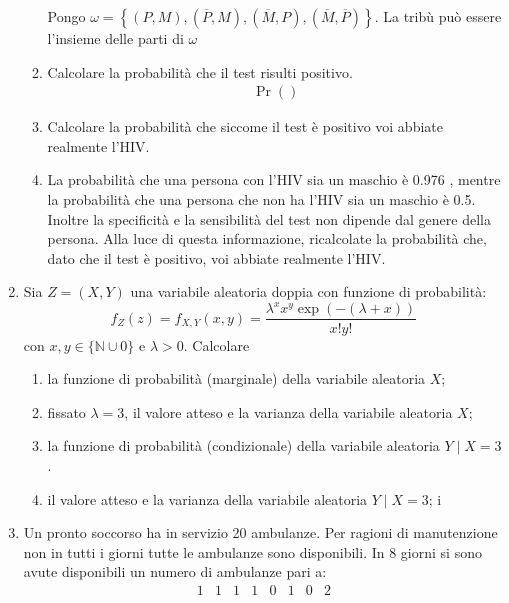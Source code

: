 \begin{enumerate}
\begin{enumerate}
\begin{center}
\begin{tikzpicture}[scale = 3]
                        \end{tikzpicture} 
            \end{center}
            Pongo $ \omega  = \left\{\left(P,M\right), \left(\overline{P}, M\right), \left(\overline{M}, P\right), \left(\overline{M}, \overline{P}\right)\right\} $. La tribù può essere l'insieme delle parti di $ \omega  $
		      \item Calcolare la probabilità che il test risulti positivo.
            \vskip3mm 
            \begin{align*}
              \Pr \left(\right)
            \end{align*}
		      \item Calcolare la probabilità che siccome il test è positivo voi abbiate realmente l'HIV.
		      \item La probabilità che una persona con l'HIV sia un maschio è 0.976 , mentre la probabilità che una persona che non ha l'HIV sia un maschio è 0.5. Inoltre la specificità e la sensibilità del test non dipende dal genere della persona. Alla luce di questa informazione, ricalcolate la probabilità che, dato che il test è positivo, voi abbiate realmente l'HIV.
	      \end{enumerate}
	\item Sia $Z=(X, Y)$ una variabile aleatoria doppia con funzione di probabilità:
	      \[
		      f_Z(z)=f_{X, Y}(x, y)=\frac{\lambda^x x^y \exp (-(\lambda+x))}{x ! y !}
	      \]
	      con $x, y \in\{\mathbb{N} \cup 0\}$ e $\lambda>0$. Calcolare
	      \begin{enumerate}
		      \item  la funzione di probabilità (marginale) della variabile aleatoria $X$;
		      \item fissato $\lambda=3$, il valore atteso e la varianza della variabile aleatoria $X$;
		      \item la funzione di probabilità (condizionale) della variabile aleatoria $Y \mid X=3$.
		      \item il valore atteso e la varianza della variabile aleatoria $Y \mid X=3$;
		            i
	      \end{enumerate}
	\item Un pronto soccorso ha in servizio 20 ambulanze. Per ragioni di manutenzione non in tutti i giorni tutte le ambulanze sono disponibili. In 8 giorni si sono avute disponibili un numero di ambulanze pari a:
	      \[
		      \begin{array}{llllllll}
			      1 & 1 & 1 & 1 & 0 & 1 & 0 & 2

\end{array}\]
\end{enumerate}
